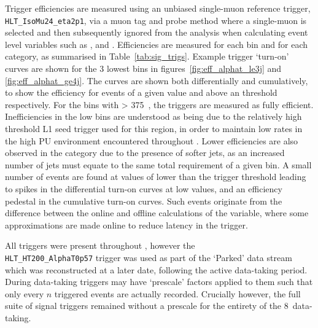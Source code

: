 Trigger efficiencies are measured using an unbiased single-muon reference
trigger,
\\\verb!HLT_IsoMu24_eta2p1!, via a muon tag and probe method where a
single-muon is selected and then subsequently ignored from the analysis when 
calculating event level variables such as \HT, \mht and \alphat. Efficiencies 
are measured for each \HT bin and for each \nj category, as summarised in 
Table~\ref{tab:sig_trigs}. Example trigger `turn-on' curves are shown for the 3 
lowest \HT bins in figures~\ref{fig:eff_alphat_le3j} and \ref{fig:eff_alphat_ge4j}.
The curves are shown both differentially and cumulatively, to show the
efficiency for events of a given \alphat value and above an \alphat threshold
respectively.
For the bins with \HT > 375~\gev, the triggers are measured as fully efficient.
Inefficiencies in the low \HT bins are
understood as being due to the relatively high threshold L1 seed trigger used
for this region, in order to maintain
low rates in the high PU environment encountered throughout \runone. Lower 
efficiencies are also observed in the \njhigh category due to the presence of 
softer jets, as an increased number of jets must equate to the same total \HT 
requirement of a given bin. A small number of events are found at values of
\alphat lower than the trigger threshold leading to spikes in the differential
turn-on curves at low \alphat values, and an efficiency pedestal in the
cumulative turn-on curves. Such
events originate from the difference between the online and offline calculations
of the \alphat variable, where some approximations are made online to reduce
latency in the trigger.

All triggers were present throughout \runone, however the 
\\\verb!HLT_HT200_AlphaT0p57! trigger was used as part of the `Parked' data
stream which was reconstructed at a later date, following the active data-taking
period. During data-taking triggers may have `prescale' factors applied to them 
such that only every $n$ triggered events are actually recorded. Crucially however,
the full suite of signal triggers remained without a prescale for the entirety of
the 8~\tev data-taking.

